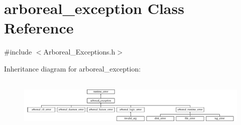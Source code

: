 \hypertarget{classarboreal__exception}{}\section{arboreal\+\_\+exception Class Reference}
\label{classarboreal__exception}


{\ttfamily \#include $<$Arboreal\+\_\+\+Exceptions.\+h$>$}

Inheritance diagram for arboreal\+\_\+exception\+:\begin{figure}[H]
\begin{center}
\leavevmode
\includegraphics[height=2.580645cm]{classarboreal__exception}
\end{center}
\end{figure}
